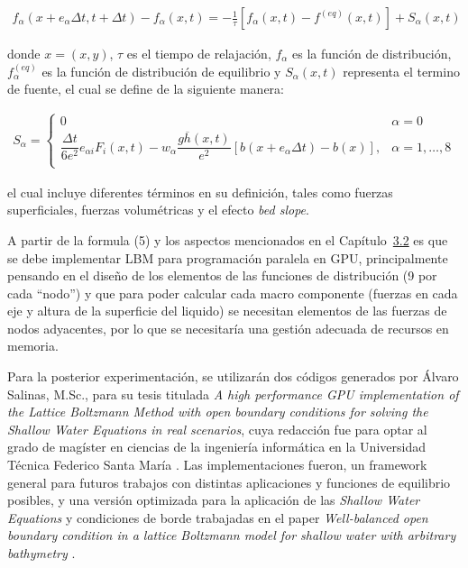 \begin{align}
    f_\alpha(x + e_\alpha\Delta t, t + \Delta t) - f_\alpha(x,t) = -\frac{1}{\tau}[f_\alpha(x,t) - f^{(eq)}(x,t)] + S_\alpha(x,t)
\end{align}

donde $x = (x, y)$, \(\tau\) es el tiempo de relajación, \(f_\alpha\) es la función de distribución, $f_\alpha^{(eq)}$ es la función de distribución de equilibrio y \(S_\alpha(x,t)\) representa el termino de fuente, el cual se define de la siguiente manera:

\begin{align}
    S_\alpha = 
     \begin{cases}
       0 & \alpha = 0\\
       \dfrac{\Delta t}{6e^2}e_{\alpha i}F_i(x,t) - w_\alpha\dfrac{g\overline{h}(x,t)}{e^2}[b(x + e_\alpha\Delta t) - b(x)], & \alpha = 1,\dots,8 \\
     \end{cases}
\end{align} 

el cual incluye diferentes términos en su definición, tales como fuerzas superficiales, fuerzas volumétricas y el efecto \textit{bed slope}. 

A partir de la formula (5) y los aspectos mencionados en el Capítulo~\hyperref[sec:3.2]{3.2} es que se debe implementar LBM para programación paralela en GPU, principalmente pensando en el diseño de los elementos de las funciones de distribución (9 por cada ``nodo'') y que para poder calcular cada macro componente (fuerzas en cada eje y altura de la superficie del liquido) se necesitan elementos de las fuerzas de nodos adyacentes, por lo que se necesitaría una gestión adecuada de recursos en memoria.

Para la posterior experimentación, se utilizarán dos códigos generados por Álvaro Salinas, M.Sc., para su tesis titulada \textit{A high performance GPU implementation of the Lattice Boltzmann Method with open boundary conditions for solving the Shallow Water Equations in real scenarios}, cuya redacción fue para optar al grado de magíster en ciencias de la ingeniería informática en la Universidad Técnica Federico Santa María \cite{thesisB}.
Las implementaciones fueron, un framework general para futuros trabajos con distintas aplicaciones y funciones de equilibrio posibles, y una versión optimizada para la aplicación de las \textit{Shallow Water Equations} y condiciones de borde trabajadas en el paper \textit{Well-balanced open boundary condition in a lattice Boltzmann model for shallow water with arbitrary bathymetry} \cite{paperB}. 

